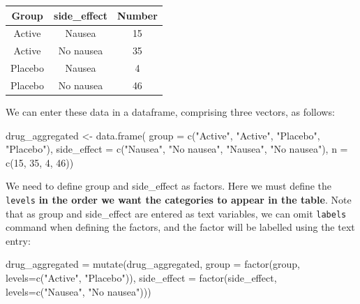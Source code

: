 \documentclass[
  a4paper,
]{memoir}
\newenvironment{Shaded}{\begin{snugshade}}{\end{snugshade}}
\newcommand{\AttributeTok}[1]{\textcolor[rgb]{0.00,0.00,0.00}{#1}}
\newcommand{\DecValTok}[1]{\textcolor[rgb]{0.00,0.00,0.00}{#1}}
\newcommand{\FunctionTok}[1]{\textcolor[rgb]{0.00,0.00,0.00}{#1}}
\newcommand{\NormalTok}[1]{\textcolor[rgb]{0.00,0.00,0.00}{#1}}
\newcommand{\OtherTok}[1]{\textcolor[rgb]{0.00,0.00,0.00}{#1}}
\newcommand{\StringTok}[1]{\textcolor[rgb]{0.00,0.00,0.00}{#1}}
\newcounter{none} %
\begin{document}
{\def\LTcaptype{none} %
\begin{longtable}[]{@{}ccc@{}}
\toprule\noalign{}
Group & side\_effect & Number \\
\midrule\noalign{}
\endhead
\bottomrule\noalign{}
\endlastfoot
Active & Nausea & 15 \\
Active & No nausea & 35 \\
Placebo & Nausea & 4 \\
Placebo & No nausea & 46 \\
\end{longtable}
}

We can enter these data in a dataframe, comprising three vectors, as
follows:

\begin{Shaded}
\begin{Highlighting}[]
\NormalTok{drug\_aggregated }\OtherTok{\textless{}{-}} \FunctionTok{data.frame}\NormalTok{(}
  \AttributeTok{group =} \FunctionTok{c}\NormalTok{(}\StringTok{"Active"}\NormalTok{, }\StringTok{"Active"}\NormalTok{, }\StringTok{"Placebo"}\NormalTok{, }\StringTok{"Placebo"}\NormalTok{),}
  \AttributeTok{side\_effect =} \FunctionTok{c}\NormalTok{(}\StringTok{"Nausea"}\NormalTok{, }\StringTok{"No nausea"}\NormalTok{, }\StringTok{"Nausea"}\NormalTok{, }\StringTok{"No nausea"}\NormalTok{),}
  \AttributeTok{n =} \FunctionTok{c}\NormalTok{(}\DecValTok{15}\NormalTok{, }\DecValTok{35}\NormalTok{, }\DecValTok{4}\NormalTok{, }\DecValTok{46}\NormalTok{))}
\end{Highlighting}
\end{Shaded}

We need to define group and side\_effect as factors. Here we must define
the \texttt{levels} \textbf{in the order we want the categories to
appear in the table}. Note that as group and side\_effect are entered as
text variables, we can omit \texttt{labels} command when defining the
factors, and the factor will be labelled using the text entry:

\begin{Shaded}
\begin{Highlighting}[]
\NormalTok{drug\_aggregated }\OtherTok{=} \FunctionTok{mutate}\NormalTok{(drug\_aggregated,}
                         \AttributeTok{group =} \FunctionTok{factor}\NormalTok{(group, }\AttributeTok{levels=}\FunctionTok{c}\NormalTok{(}\StringTok{"Active"}\NormalTok{, }\StringTok{"Placebo"}\NormalTok{)),}
                         \AttributeTok{side\_effect =} \FunctionTok{factor}\NormalTok{(side\_effect, }\AttributeTok{levels=}\FunctionTok{c}\NormalTok{(}\StringTok{"Nausea"}\NormalTok{, }\StringTok{"No nausea"}\NormalTok{)))}
\end{Highlighting}
\end{Shaded}
\end{document}
